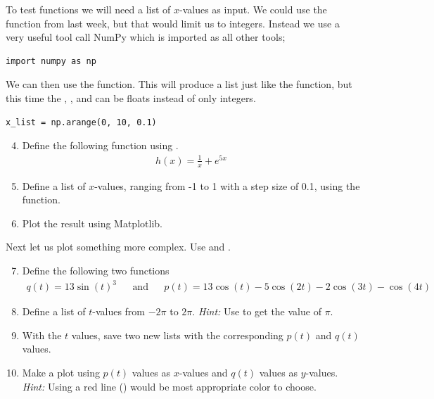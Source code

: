 \documentclass{article}
\begin{document}
To test functions we will need a list of $x$-values as input.
We could use the  function from last week, but that would limit us to
integers. Instead we use a very useful tool call NumPy which is imported as all other tools;

\begin{lstlisting}
import numpy as np
\end{lstlisting}

We can then use the  function.
This will produce a list just like the  function, but this time the
,
, and
can be floats instead of only integers.

\begin{lstlisting}
x_list = np.arange(0, 10, 0.1)
\end{lstlisting}

\begin{enumerate}
  \setcounter{enumi}{3}
  \item Define the following function using .
    \begin{align}
        h(x) = \frac{1}{x} + e^{5x}
    \end{align}

  \item Define a list of $x$-values, ranging from -1 to 1 with a step size of 0.1, using the  function.

  \item Plot the result using Matplotlib.

\end{enumerate}

Next let us plot something more complex. Use  and .

\begin{enumerate}
    \setcounter{enumi}{6}
    \item Define the following two functions
    \begin{align}
        q(t) = 13\sin(t)^3 && \text{and} && p(t) = 13\cos(t) - 5 \cos(2t) - 2 \cos(3t) - \cos(4t)
    \end{align}

    \item Define a list of $t$-values from $-2\pi$ to $2\pi$.
      {\em Hint:} Use  to get the value of $\pi$.

    \item With the $t$ values, save two new lists with the corresponding $p(t)$ and $q(t)$ values.

    \item Make a plot using $p(t)$ values as $x$-values and $q(t)$ values as $y$-values.
        {\em Hint:} Using a red line () would be most appropriate color to choose.


\end{enumerate}
\end{document}

